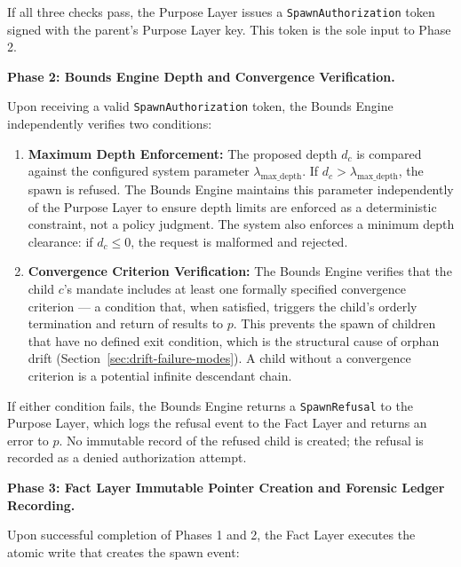 If all three checks pass, the Purpose Layer issues a \texttt{SpawnAuthorization} token signed with the parent's Purpose Layer key. This token is the sole input to Phase 2.

\bigskip
\noindent\textbf{Phase 2: Bounds Engine Depth and Convergence Verification.}

Upon receiving a valid \texttt{SpawnAuthorization} token, the Bounds Engine independently verifies two conditions:

\begin{enumerate}
    \item \textbf{Maximum Depth Enforcement:} The proposed depth $d_c$ is compared against the configured system parameter $\lambda_{\text{max\_depth}}$. If $d_c > \lambda_{\text{max\_depth}}$, the spawn is refused. The Bounds Engine maintains this parameter independently of the Purpose Layer to ensure depth limits are enforced as a deterministic constraint, not a policy judgment. The system also enforces a minimum depth clearance: if $d_c \leq 0$, the request is malformed and rejected.
    \item \textbf{Convergence Criterion Verification:} The Bounds Engine verifies that the child $c$'s mandate includes at least one formally specified convergence criterion — a condition that, when satisfied, triggers the child's orderly termination and return of results to $p$. This prevents the spawn of children that have no defined exit condition, which is the structural cause of orphan drift (Section~\ref{sec:drift-failure-modes}). A child without a convergence criterion is a potential infinite descendant chain.
\end{enumerate}

If either condition fails, the Bounds Engine returns a \texttt{SpawnRefusal} to the Purpose Layer, which logs the refusal event to the Fact Layer and returns an error to $p$. No immutable record of the refused child is created; the refusal is recorded as a denied authorization attempt.

\bigskip
\noindent\textbf{Phase 3: Fact Layer Immutable Pointer Creation and Forensic Ledger Recording.}

Upon successful completion of Phases 1 and 2, the Fact Layer executes the atomic write that creates the spawn event:

